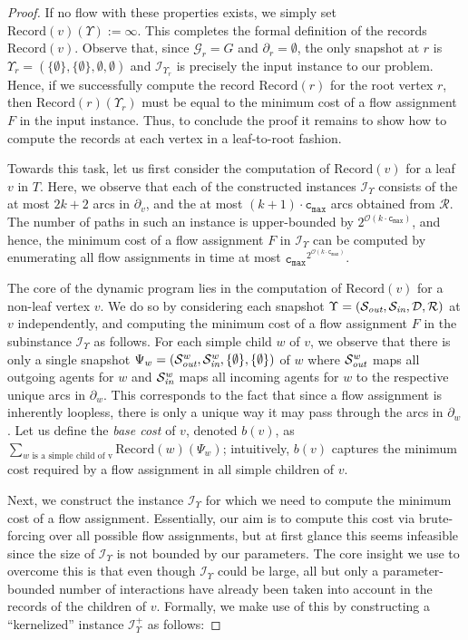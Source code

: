 \documentclass[letterpaper]{article} %
\newcommand{\bigoh}{\ensuremath{{\mathcal O}}}
\newcommand{\cmax}{\mathtt{c_{max}}}
\newcommand{\forgottenG}{\mathcal{G}}
\newcommand{\Rec}{\text{Record}}
\renewcommand{\R}{\mathcal{R}}
\renewcommand{\D}{\mathcal{D}}
\newcommand{\Sout}{\mathcal{S}_\emph{out}}
\newcommand{\Sin}{\mathcal{S}_\emph{in}}
\begin{document}
\begin{proof}
If no flow with these properties exists, we simply set $\Rec(v)(\Upsilon):=\infty$. This completes the formal definition of the records $\Rec(v)$. Observe that, since $\forgottenG_r=G$ and $\partial_r=\emptyset$, the only snapshot at $r$ is $\Upsilon_r=(\{\emptyset\},\{\emptyset\},\emptyset,\emptyset)$ and $\mathcal{I}_{\Upsilon_r}$ is precisely the input instance to our problem. Hence, if we successfully compute the record $\Rec(r)$ for the root vertex $r$, then $\Rec(r)(\Upsilon_r)$ must be equal to the minimum cost of a flow assignment $F$ in the input instance. Thus, to conclude the proof it remains to show how to compute the records at each vertex in a leaf-to-root fashion.

Towards this task, let us first consider the computation of $\Rec(v)$ for a leaf $v$ in $T$. Here, we observe that each of the constructed instances $\mathcal{I}_\Upsilon$ consists of the at most $2k+2$ arcs in $\partial_v$, and the at most $(k+1)\cdot \cmax$ arcs obtained from $\R$. The number of paths in such an instance is upper-bounded by $2^{\bigoh(k\cdot \cmax)}$, and hence, the minimum cost of a flow assignment $F$ in $\mathcal{I}_\Upsilon$ can be computed by enumerating all flow assignments in time at most $\cmax^{2^{\bigoh(k\cdot \cmax)}}$.

The core of the dynamic program lies in the computation of $\Rec(v)$ for a non-leaf vertex $v$. We do so by considering each snapshot $\Upsilon=(\Sout,\Sin,\D,\R)$ at $v$ independently, and computing the minimum cost of a flow assignment $F$ in the subinstance $\mathcal{I}_\Upsilon$ as follows. For each simple child $w$ of $v$, we observe that there is only a single snapshot $\Psi_w=(\Sout^w,\Sin^w,\{\emptyset\},\{\emptyset\})$ of $w$ where $\Sout^w$ maps all outgoing agents for $w$ and $\Sin^w$ maps all incoming agents for $w$ to the respective unique arcs in $\partial_w$. This corresponds to the fact that since a flow assignment is inherently loopless, there is only a unique way it may pass through the arcs in $\partial_w$. Let us define the \emph{base cost} of $v$, denoted $b(v)$, as $\sum_{w\text{ is a simple child of v}}\Rec(w)(\Psi_w)$; intuitively, $b(v)$ captures the minimum cost required by a flow assignment in all simple children of $v$.

Next, we construct the instance $\mathcal{I}_\Upsilon$ for which we need to compute the minimum cost of a flow assignment. Essentially, our aim is to compute this cost via brute-forcing over all possible flow assignments, but at first glance this seems infeasible since the size of $\mathcal{I}_\Upsilon$ is not bounded by our parameters. The core insight we use to overcome this is that even though $\mathcal{I}_\Upsilon$ could be large, all but only a parameter-bounded number of interactions have already been taken into account in the records of the children of $v$.
Formally, we make use of this by constructing a ``kernelized'' instance $\mathcal{I}^+_\Upsilon$ as follows:


\end{proof}
\end{document}
